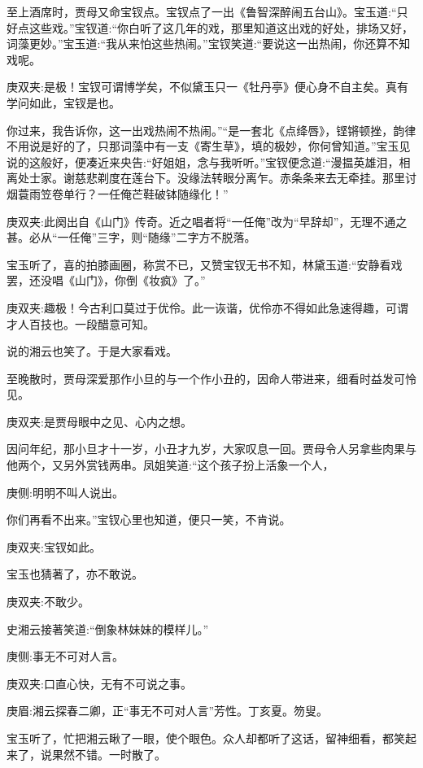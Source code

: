 \begin{parag}
    至上酒席时，贾母又命宝钗点。宝钗点了一出《鲁智深醉闹五台山》。宝玉道:“只好点这些戏。”宝钗道:“你白听了这几年的戏，那里知道这出戏的好处，排场又好，词藻更妙。”宝玉道:“我从来怕这些热闹。”宝钗笑道:“要说这一出热闹，你还算不知戏呢。\begin{note}庚双夹:是极！宝钗可谓博学矣，不似黛玉只一《牡丹亭》便心身不自主矣。真有学问如此，宝钗是也。\end{note}你过来，我告诉你，这一出戏热闹不热闹。”“是一套北《点绛唇》，铿锵顿挫，韵律不用说是好的了，只那词藻中有一支《寄生草》，填的极妙，你何曾知道。”宝玉见说的这般好，便凑近来央告:“好姐姐，念与我听听。”宝钗便念道:“漫揾英雄泪，相离处士家。谢慈悲剃度在莲台下。没缘法转眼分离乍。赤条条来去无牵挂。那里讨烟蓑雨笠卷单行？一任俺芒鞋破钵随缘化！”\begin{note}庚双夹:此阕出自《山门》传奇。近之唱者将“一任俺”改为“早辞却”，无理不通之甚。必从“一任俺”三字，则“随缘”二字方不脱落。\end{note}
\end{parag}


\begin{parag}
    宝玉听了，喜的拍膝画圈，称赏不已，又赞宝钗无书不知，林黛玉道:“安静看戏罢，还没唱《山门》，你倒《妆疯》了。”\begin{note}庚双夹:趣极！今古利口莫过于优伶。此一诙谐，优伶亦不得如此急速得趣，可谓才人百技也。一段醋意可知。\end{note}说的湘云也笑了。于是大家看戏。
\end{parag}


\begin{parag}
    至晚散时，贾母深爱那作小旦的与一个作小丑的，因命人带进来，细看时益发可怜见。\begin{note}庚双夹:是贾母眼中之见、心内之想。\end{note}因问年纪，那小旦才十一岁，小丑才九岁，大家叹息一回。贾母令人另拿些肉果与他两个，又另外赏钱两串。凤姐笑道:“这个孩子扮上活象一个人，\begin{note}庚侧:明明不叫人说出。\end{note}你们再看不出来。”宝钗心里也知道，便只一笑，不肯说。\begin{note}庚双夹:宝钗如此。\end{note}宝玉也猜著了，亦不敢说。\begin{note}庚双夹:不敢少。\end{note}史湘云接著笑道:“倒象林妹妹的模样儿。”\begin{note}庚侧:事无不可对人言。\end{note}\begin{note}庚双夹:口直心快，无有不可说之事。\end{note}\begin{note}庚眉:湘云探春二卿，正“事无不可对人言”芳性。丁亥夏。笏叟。\end{note}宝玉听了，忙把湘云瞅了一眼，使个眼色。众人却都听了这话，留神细看，都笑起来了，说果然不错。一时散了。
\end{parag}


